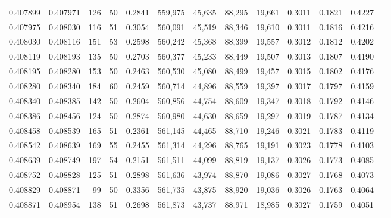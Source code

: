 \begin{tabular}{rrrrrrrrrrrrr}
0.407899 & 0.407971 &   126 &  50 &                                     0.2841 & 559,975 &  45,635 &  88,295 &  19,661 & 0.3011 & 0.1821 & 0.4227 \\
0.407975 & 0.408030 &   116 &  51 &                                     0.3054 & 560,091 &  45,519 &  88,346 &  19,610 & 0.3011 & 0.1816 & 0.4216 \\
0.408030 & 0.408116 &   151 &  53 &                                     0.2598 & 560,242 &  45,368 &  88,399 &  19,557 & 0.3012 & 0.1812 & 0.4202 \\
0.408119 & 0.408193 &   135 &  50 &                                     0.2703 & 560,377 &  45,233 &  88,449 &  19,507 & 0.3013 & 0.1807 & 0.4190 \\
0.408195 & 0.408280 &   153 &  50 &                                     0.2463 & 560,530 &  45,080 &  88,499 &  19,457 & 0.3015 & 0.1802 & 0.4176 \\
0.408280 & 0.408340 &   184 &  60 &                                     0.2459 & 560,714 &  44,896 &  88,559 &  19,397 & 0.3017 & 0.1797 & 0.4159 \\
0.408340 & 0.408385 &   142 &  50 &                                     0.2604 & 560,856 &  44,754 &  88,609 &  19,347 & 0.3018 & 0.1792 & 0.4146 \\
0.408386 & 0.408456 &   124 &  50 &                                     0.2874 & 560,980 &  44,630 &  88,659 &  19,297 & 0.3019 & 0.1787 & 0.4134 \\
0.408458 & 0.408539 &   165 &  51 &                                     0.2361 & 561,145 &  44,465 &  88,710 &  19,246 & 0.3021 & 0.1783 & 0.4119 \\
0.408542 & 0.408639 &   169 &  55 &                                     0.2455 & 561,314 &  44,296 &  88,765 &  19,191 & 0.3023 & 0.1778 & 0.4103 \\
0.408639 & 0.408749 &   197 &  54 &                                     0.2151 & 561,511 &  44,099 &  88,819 &  19,137 & 0.3026 & 0.1773 & 0.4085 \\
0.408752 & 0.408828 &   125 &  51 &                                     0.2898 & 561,636 &  43,974 &  88,870 &  19,086 & 0.3027 & 0.1768 & 0.4073 \\
0.408829 & 0.408871 &    99 &  50 &                                     0.3356 & 561,735 &  43,875 &  88,920 &  19,036 & 0.3026 & 0.1763 & 0.4064 \\
0.408871 & 0.408954 &   138 &  51 &                                     0.2698 & 561,873 &  43,737 &  88,971 &  18,985 & 0.3027 & 0.1759 & 0.4051 \\

\end{tabular}
